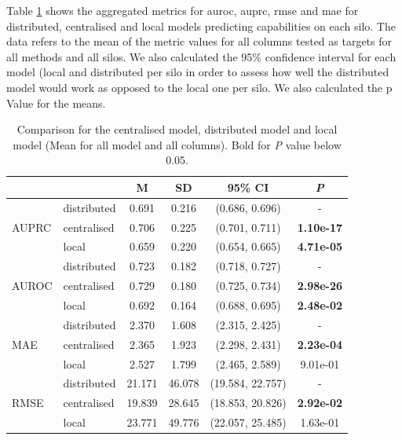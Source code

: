 Table \ref{tab:allvsall} shows the aggregated metrics for \ac{auroc}, \ac{auprc}, \ac{rmse} and \ac{mae} for distributed, centralised and local models predicting capabilities on each silo. The data refers to the mean of the metric values for all columns tested as targets for all methods and all silos. We also calculated the 95\% confidence interval for each model (local and distributed per silo in order to assess how well the distributed model would work as opposed to the local one per silo. We also calculated the p Value for the means.

\begin{table}[htbp] 
 \setlength{\tabcolsep}{7pt} %
 \renewcommand{\arraystretch}{1.3} %
  \captionsetup{justification=centering} 
\centering
\caption{Comparison for the centralised model, distributed model and local model (Mean for all model and all columns). Bold for \textit{P} value below 0.05.}
\label{tab:allvsall}
\begin{tabular}{llcccc}
\toprule
 &  & M & SD & 95\% CI & \textit{P}  \\
\midrule
\multirow[t]{3}{*}{AUPRC}
 & distributed & 0.691 & 0.216 & (0.686, 0.696) & - \\
  & centralised & 0.706 & 0.225 & (0.701, 0.711) & \bfseries 1.10e-17 \\
 & local & 0.659 & 0.220 & (0.654, 0.665) & \bfseries 4.71e-05 \\
 \hline

\multirow[t]{3}{*}{AUROC} 
 & distributed & 0.723 & 0.182 & (0.718, 0.727) & - \\
 & centralised & 0.729 & 0.180 & (0.725, 0.734) & \bfseries 2.98e-26 \\
 & local & 0.692 & 0.164 & (0.688, 0.695) & \bfseries 2.48e-02 \\

\hline

\multirow[t]{3}{*}{MAE} 
 & distributed & 2.370 & 1.608 & (2.315, 2.425) & - \\
 & centralised & 2.365 & 1.923 & (2.298, 2.431) & \bfseries 2.23e-04 \\
 & local & 2.527 & 1.799 & (2.465, 2.589) & 9.01e-01 \\

\hline

\multirow[t]{3}{*}{RMSE} 
 & distributed & 21.171 & 46.078 & (19.584, 22.757) & - \\
 & centralised & 19.839 & 28.645 & (18.853, 20.826) & \bfseries 2.92e-02 \\
 & local & 23.771 & 49.776 & (22.057, 25.485) & 1.63e-01 \\
\hline
\end{tabular}
\end{table}





